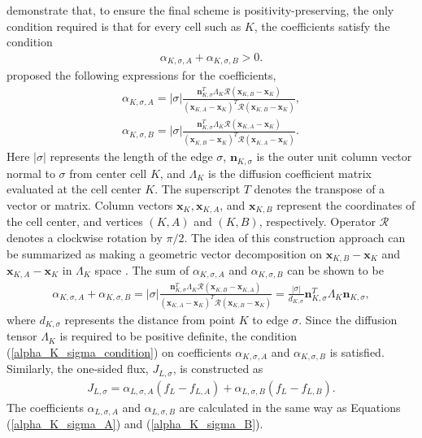 \documentclass[11pt]{article}
\begin{document}
 demonstrate that, to ensure the final scheme is positivity-preserving, the only condition required is that for every cell such as $K$, the coefficients satisfy the condition 
  \begin{align}
    \label{alpha_K_sigma_condition}
    \alpha_{K,\sigma, A} + \alpha_{K,\sigma, B} > 0.
  \end{align}
 proposed the following expressions for the coefficients,  
  \begin{align}
    \label{alpha_K_sigma_A}
    \alpha_{K,\sigma, A} = |\sigma|\frac{\boldsymbol{n}_{K,\sigma}^T\Lambda_K\mathcal{R}(\boldsymbol{x}_{K,B} - \boldsymbol{x}_K)}{(\boldsymbol{x}_{K,A} - \boldsymbol{x}_K)^T\mathcal{R}(\boldsymbol{x}_{K,B} - \boldsymbol{x}_K)}, \\
    \label{alpha_K_sigma_B}
    \alpha_{K,\sigma, B} = |\sigma|\frac{\boldsymbol{n}_{K,\sigma}^T\Lambda_K\mathcal{R}(\boldsymbol{x}_{K,A} - \boldsymbol{x}_K)}{(\boldsymbol{x}_{K,B} - \boldsymbol{x}_K)^T\mathcal{R}(\boldsymbol{x}_{K,A} - \boldsymbol{x}_K)}.
  \end{align}
Here $|\sigma|$ represents the length of the edge $\sigma$,
$\boldsymbol{n}_{K,\sigma}$ is the outer unit column vector normal to $\sigma$
from center cell $K$, and $\Lambda_K$ is the diffusion coefficient matrix
evaluated at the cell center $K$. The superscript $T$ denotes the transpose of a
vector or matrix. Column vectors $\boldsymbol{x}_{K}, \boldsymbol{x}_{K,A}$, and
$\boldsymbol{x}_{K,B}$ represent the coordinates of the cell center, and
vertices $(K,A)$ and $(K,B)$, respectively. Operator $\mathcal{R}$ denotes a
clockwise rotation by $\pi/2$. The idea of this construction approach can be
summarized as making a geometric vector decomposition on $\boldsymbol{x}_{K,B} - \boldsymbol{x}_K$ and $\boldsymbol{x}_{K,A} - \boldsymbol{x}_K$ in $\Lambda_K$ space \cite{LIPNIKOV2007, WU2014}. The sum of $\alpha_{K,\sigma, A}$ and $\alpha_{K,\sigma, B}$ can be shown to be \cite{Gao2015}
  \begin{align}
    \alpha_{K,\sigma, A} + \alpha_{K,\sigma, B} = |\sigma| \frac{\boldsymbol{n}_{K,\sigma}^T\Lambda_K\mathcal{R}(\boldsymbol{x}_{K,B} - \boldsymbol{x}_{K,A})}{(\boldsymbol{x}_{K,A} - \boldsymbol{x}_K)^T\mathcal{R}(\boldsymbol{x}_{K,B} - \boldsymbol{x}_K)} = \frac{|\sigma|}{d_{K,\sigma}}\boldsymbol{n}_{K,\sigma}^T\Lambda_K\boldsymbol{n}_{K,\sigma},
  \end{align}
where $d_{K, \sigma}$ represents the distance from point $K$ to edge $\sigma$. Since the diffusion tensor $\Lambda_K$ is required to be positive definite, the condition (\ref{alpha_K_sigma_condition}) on coefficients $\alpha_{K,\sigma,A}$ and $\alpha_{K,\sigma,B}$ is satisfied. Similarly, the one-sided flux, $J_{L,\sigma}$, is constructed as
  \begin{align}
    \label{J_L_sigma}
    J_{L,\sigma} = \alpha_{L,\sigma, A}(f_L - f_{L,A}) + \alpha_{L,\sigma, B}(f_L - f_{L,B}).
  \end{align}
The coefficients $\alpha_{L,\sigma,A}$ and $\alpha_{L,\sigma,B}$ are calculated in the same way as Equations (\ref{alpha_K_sigma_A}) and (\ref{alpha_K_sigma_B}).
\end{document}
